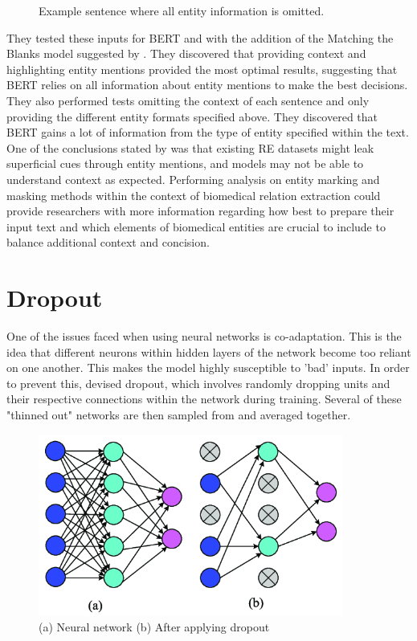 \documentclass{l4proj}
\begin{document}
\begin{figure}[htb]
    \centering
  \caption{Example sentence where all entity information is omitted.}
  \label{fig:TACREDgmask}
\end{figure}


They tested these inputs for BERT and with the addition of the Matching the Blanks model suggested by \cite{architectures}. They discovered that providing context and highlighting entity mentions provided the most optimal results, suggesting that BERT relies on all information about entity mentions to make the best decisions. They also performed tests omitting the context of each sentence and only providing the different entity formats specified above. They discovered that BERT gains a lot of information from the type of entity specified within the text. One of the conclusions stated by \cite{mask} was that existing RE datasets might leak superficial cues through entity mentions, and models may not be able to understand context as expected. Performing analysis on entity marking and masking methods within the context of biomedical relation extraction could provide researchers with more information regarding how best to prepare their input text and which elements of biomedical entities are crucial to include to balance additional context and concision.

\newpage
\section{Dropout}
One of the issues faced when using neural networks is co-adaptation. This is the idea that different neurons within hidden layers of the network become too reliant on one another. This makes the model highly susceptible to 'bad' inputs. In order to prevent this, \cite{dropout} devised dropout, which involves randomly dropping units and their respective connections within the network during training. Several of these "thinned out" networks are then sampled from and averaged together.

\begin{figure}[htb]
    \centering
   \includegraphics[width=10cm]{images/Dropout.png}
  \caption{ (a) Neural network (b) After applying dropout }
  \label{fig:Dropout}
\end{figure}
\end{document}
